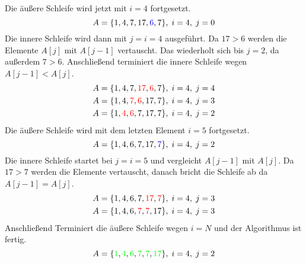 \noindent
Die äußere Schleife wird jetzt mit $i=4$ fortgesetzt.
\begin{equation}
	A = \{1,4,7,17,\textcolor{blue}{6},7\},\;i = 4,\;j=0 \\
\end{equation}
\noindent
Die innere Schleife wird dann mit $j=i=4$ ausgeführt. Da $17 > 6$ werden die Elemente $A[j]$ mit $A[j-1]$ vertauscht. Das wiederholt sich bis $j=2$, da außerdem $7 > 6$. Anschließend terminiert die innere Schleife wegen $A[j-1] < A[j]$.
\begin{equation}
	\begin{split}
		A = \{1, 4, 7, \textcolor{red}{17}, \textcolor{red}{6}, 7\},\;i = 4,\;j=4 \\
		A = \{1, 4, \textcolor{red}{7}, \textcolor{red}{6}, 17, 7\},\;i = 4,\;j=3 \\
		A = \{1, \textcolor{red}{4}, \textcolor{red}{6}, 7, 17, 7\},\;i = 4,\;j=2 \\
	\end{split}
\end{equation}
\noindent
Die äußere Schleife wird mit dem letzten Element $i=5$ fortgesetzt.
\begin{equation}
	A = \{1,4,6,7,17,\textcolor{blue}{7}\},\;i = 4,\;j=2 \\
\end{equation}
\newpage
\noindent
Die innere Schleife startet bei $j=i=5$ und vergleicht $A[j-1]$ mit $A[j]$. Da $17 > 7$ werden die Elemente vertauscht, danach bricht die Schleife ab da $A[j-1] = A[j]$.
\begin{equation}
	\begin{split}
		A = \{1,4,6,7,\textcolor{red}{17},\textcolor{red}{7}\},\;i = 4,\;j=3 \\
		A = \{1,4,6,\textcolor{red}{7},\textcolor{red}{7}, 17\},\;i = 4,\;j=3 \\
	\end{split}
\end{equation}
\noindent
Anschließend Terminiert die äußere Schleife wegen $i = N$ und der Algorithmus ist fertig.
\begin{equation}
	A = \{\textcolor{green}{1},\textcolor{green}{4},\textcolor{green}{6},\textcolor{green}{7},\textcolor{green}{7},\textcolor{green}{17}\},\;i = 4,\;j=2 \\
\end{equation}
\newpage
